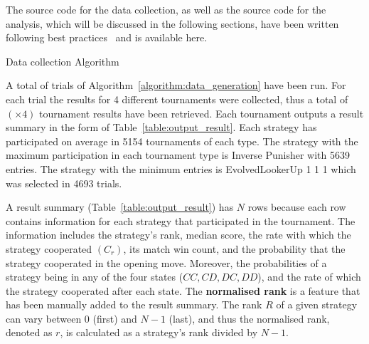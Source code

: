 \documentclass{article}
\newcommand{\uniquenumberofseeds}{}
\newcommand{\numberofalltournaments}{}
\begin{document}
The source code for the data collection, as well as the source code for
the analysis, which will be discussed in the following sections, have been written
following best practices~\cite{Aberdour2007, Benureau2018}
and is available here. %

\begin{algorithm}[!htbp]
    \;
    \caption{Data collection Algorithm}
    \label{algorithm:data_generation}
\end{algorithm}

A total of \uniquenumberofseeds trials of Algorithm~\ref{algorithm:data_generation} have been
run. For each trial the results for 4 different tournaments were collected,
thus a total of \numberofalltournaments $(\uniquenumberofseeds \times 4)$ tournament results have been
retrieved. Each tournament outputs a result summary in the form of
Table~\ref{table:output_result}. Each strategy has participated on average in
5154 tournaments of each type. The strategy with the maximum participation in each
tournament type is Inverse Punisher with 5639 entries. The strategy with the
minimum entries is EvolvedLookerUp 1 1 1 which was selected in 4693 trials.

A result summary (Table~\ref{table:output_result}) has \(N\) rows
because each row contains information for each strategy that participated in the
tournament. The information includes the strategy's rank, median score, the rate
with which the strategy cooperated $(C_r)$, its match win count, and the
probability that the strategy cooperated in the opening move. Moreover, the
probabilities of a strategy being in any of the four states ($CC, CD, DC, DD$),
and the rate of which the strategy cooperated after each state. The \textbf{normalised rank}
is a feature that has been manually added to the result summary. The rank \(R\) of a given
strategy can vary between 0 (first) and \(N-1\) (last), and thus the normalised rank,
denoted as $r$, is calculated as a strategy's rank divided by \(N - 1\).
\end{document}
